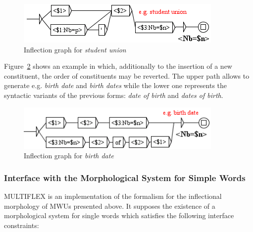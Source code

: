 \begin{figure}[!htb]
  \centering
  \includegraphics[width=10cm]{resources/img/StudentUnion.png}
  \caption{Inflection graph for \emph{student union}}
  \label{fig:StudentUnion}
\end{figure}

\bigskip
\noindent Figure~\ref{fig:BirthDate} shows an example in which, additionally to the insertion 
of a new constituent, the order of constituents may be reverted. The upper path allows to 
generate e.g. \emph{birth date} and  \emph{birth dates} while the lower one represents the 
syntactic variants of the previous forms: \emph{date of birth} and \emph{dates of birth}.

\begin{figure}[!htb]
  \centering
  \includegraphics[width=10cm]{resources/img/BirthDate.png}
  \caption{Inflection graph for \emph{birth date}}
  \label{fig:BirthDate}
\end{figure}

\subsubsection{Interface with the Morphological System for Simple Words}
\label{Interface}
MULTIFLEX is an implementation of the formalism for the inflectional morphology of MWUs 
presented above. It supposes the existence of a morphological system for single words 
which satisfies the following interface constraints:

